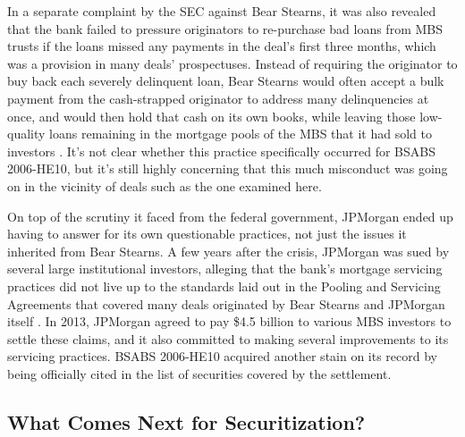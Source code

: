 \documentclass[12pt]{article}
\begin{document}
In a separate complaint by the SEC against Bear Stearns, it was also revealed that the bank failed to pressure originators to re-purchase bad loans from MBS trusts if the loans missed any payments in the deal’s first three months, which was a provision in many deals’ prospectuses. Instead of requiring the originator to buy back each severely delinquent loan, Bear Stearns would often accept a bulk payment from the cash-strapped originator to address many delinquencies at once, and would then hold that cash on its own books, while leaving those low-quality loans remaining in the mortgage pools of the MBS that it had sold to investors \parencite{sec13}. It's not clear whether this practice specifically occurred for BSABS 2006-HE10, but it’s still highly concerning that this much misconduct was going on in the vicinity of deals such as the one examined here.

On top of the scrutiny it faced from the federal government, JPMorgan ended up having to answer for its own questionable practices, not just the issues it inherited from Bear Stearns. A few years after the crisis, JPMorgan was sued by several large institutional investors, alleging that the bank’s mortgage servicing practices did not live up to the standards laid out in the Pooling and Servicing Agreements that covered many deals originated by Bear Stearns and JPMorgan itself \parencite{gibbs13}. In 2013, JPMorgan agreed to pay \$4.5 billion to various MBS investors to settle these claims, and it also committed to making several improvements to its servicing practices. BSABS 2006-HE10 acquired another stain on its record by being officially cited in the list of securities covered by the settlement.

\subsection*{What Comes Next for Securitization?}
\end{document}
